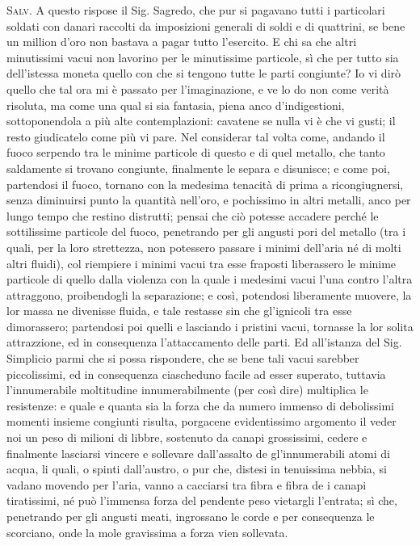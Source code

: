 \documentclass[11pt,twoside,openany]{book}
\newcommand{\speaker}[1]{\textcolor{rubric}{\textsc{#1}}\space}
\begin{document}
\speaker{Salv.} A questo rispose il Sig. Sagredo, che pur si pagavano tutti i particolari soldati con danari raccolti da imposizioni generali di soldi e di quattrini, se bene un million d'oro non bastava a pagar tutto l'esercito. E chi sa che altri minutissimi vacui non lavorino per le minutissime particole, sì che per tutto sia dell'istessa moneta quello con che si tengono tutte le parti congiunte? Io vi dirò quello che tal ora mi è passato per l'imaginazione, e ve lo do non come verità risoluta, ma come una qual si sia fantasia, piena anco d'indigestioni, sottoponendola a più alte contemplazioni: cavatene se nulla vi è che vi gusti; il resto giudicatelo come più vi pare. Nel considerar tal volta come, andando il fuoco serpendo tra le minime particole di questo e di quel metallo, che tanto saldamente si trovano congiunte, finalmente le separa e disunisce; e come poi, partendosi il fuoco, tornano con la medesima tenacità di prima a ricongiugnersi, senza diminuirsi punto la quantità nell'oro, e pochissimo in altri metalli, anco per lungo tempo che restino distrutti; pensai che ciò potesse accadere perché le sottilissime particole del fuoco, penetrando per gli angusti pori del metallo (tra i quali, per la loro strettezza, non potessero passare i minimi dell'aria né di molti altri fluidi), col riempiere i minimi vacui tra esse fraposti liberassero le minime particole di quello dalla violenza con la quale i medesimi vacui l'una contro l'altra attraggono, proibendogli la separazione; e così, potendosi liberamente muovere, la lor massa ne divenisse fluida, e tale restasse sin che gl'ignicoli tra esse dimorassero; partendosi poi quelli e lasciando i pristini vacui, tornasse la lor solita attrazzione, ed in consequenza l'attaccamento delle parti. Ed all'istanza del Sig. Simplicio parmi che si possa rispondere, che se bene tali vacui sarebber piccolissimi, ed in consequenza ciascheduno facile ad esser superato, tuttavia l'innumerabile moltitudine innumerabilmente (per così dire) multiplica le resistenze: e quale e quanta sia la forza che da numero immenso di debolissimi momenti insieme congiunti risulta, porgacene evidentissimo argomento il veder noi un peso di milioni di libbre, sostenuto da canapi grossissimi, cedere e finalmente lasciarsi vincere e sollevare dall'assalto de gl'innumerabili atomi di acqua, li quali, o spinti dall'austro, o pur che, distesi in tenuissima nebbia, si vadano movendo per l'aria, vanno a cacciarsi tra fibra e fibra de i canapi tiratissimi, né può l'immensa forza del pendente peso vietargli l'entrata; sì che, penetrando per gli angusti meati, ingrossano le corde e per consequenza le scorciano, onde la mole gravissima a forza vien sollevata.
\end{document}
